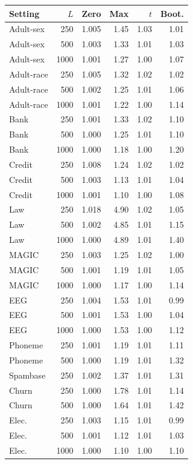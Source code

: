 \begin{tabular}{lrrrrr}
\toprule
Setting & $L$ & Zero & Max & $t$ & Boot. \\
\midrule
Adult-sex & 250 & 1.005 & 1.45 & 1.03 & 1.01 \\
Adult-sex & 500 & 1.003 & 1.33 & 1.01 & 1.03 \\
Adult-sex & 1000 & 1.001 & 1.27 & 1.00 & 1.07 \\
Adult-race & 250 & 1.005 & 1.32 & 1.02 & 1.02 \\
Adult-race & 500 & 1.002 & 1.25 & 1.01 & 1.06 \\
Adult-race & 1000 & 1.001 & 1.22 & 1.00 & 1.14 \\
Bank & 250 & 1.001 & 1.33 & 1.02 & 1.10 \\
Bank & 500 & 1.000 & 1.25 & 1.01 & 1.10 \\
Bank & 1000 & 1.000 & 1.18 & 1.00 & 1.20 \\
Credit & 250 & 1.008 & 1.24 & 1.02 & 1.02 \\
Credit & 500 & 1.003 & 1.13 & 1.01 & 1.04 \\
Credit & 1000 & 1.001 & 1.10 & 1.00 & 1.08 \\
Law & 250 & 1.018 & 4.90 & 1.02 & 1.05 \\
Law & 500 & 1.002 & 4.85 & 1.01 & 1.15 \\
Law & 1000 & 1.000 & 4.89 & 1.01 & 1.40 \\
MAGIC & 250 & 1.003 & 1.25 & 1.02 & 1.00 \\
MAGIC & 500 & 1.001 & 1.19 & 1.01 & 1.05 \\
MAGIC & 1000 & 1.000 & 1.17 & 1.00 & 1.14 \\
EEG & 250 & 1.004 & 1.53 & 1.01 & 0.99 \\
EEG & 500 & 1.001 & 1.53 & 1.00 & 1.04 \\
EEG & 1000 & 1.000 & 1.53 & 1.00 & 1.12 \\
Phoneme & 250 & 1.001 & 1.19 & 1.01 & 1.11 \\
Phoneme & 500 & 1.000 & 1.19 & 1.01 & 1.32 \\
Spambase & 250 & 1.002 & 1.37 & 1.01 & 1.31 \\
Churn & 250 & 1.000 & 1.78 & 1.01 & 1.14 \\
Churn & 500 & 1.000 & 1.64 & 1.01 & 1.42 \\
Elec. & 250 & 1.003 & 1.15 & 1.01 & 0.99 \\
Elec. & 500 & 1.001 & 1.12 & 1.01 & 1.03 \\
Elec. & 1000 & 1.000 & 1.10 & 1.00 & 1.10 \\
\bottomrule
\end{tabular}
